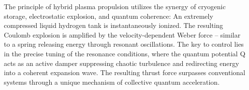 The principle of hybrid plasma propulsion utilizes the synergy of cryogenic storage, electrostatic explosion, and quantum coherence: An extremely compressed liquid hydrogen tank is instantaneously ionized. The resulting Coulomb explosion is amplified by the velocity-dependent Weber force – similar to a spring releasing energy through resonant oscillations. The key to control lies in the precise tuning of the resonance conditions, where the quantum potential Q acts as an active damper suppressing chaotic turbulence and redirecting energy into a coherent expansion wave. The resulting thrust force surpasses conventional systems through a unique mechanism of collective quantum acceleration.